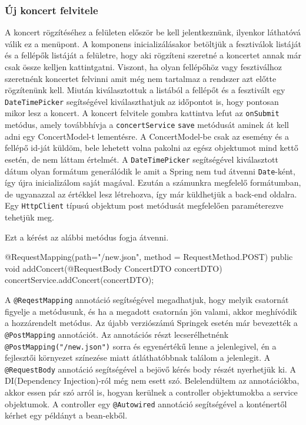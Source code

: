 \subsubsection{Új koncert felvitele}
A koncert rögzítéséhez a felületen először be kell jelentkeznünk, ilyenkor láthatóvá válik ez a menüpont. A komponens inicializálásakor betöltjük a fesztiválok listáját és a fellépők listáját a felületre, hogy aki rögzíteni szeretné a koncertet annak már csak össze kelljen kattintgatni. Viszont, ha olyan fellépőhöz vagy fesztiválhoz szeretnénk koncertet felvinni amit még nem tartalmaz a rendszer azt előtte rögzítenünk kell. Miután kiválasztottuk a listából a fellépőt és a fesztivált egy \texttt{DateTimePicker} segítségével kiválaszthatjuk az időpontot is, hogy pontosan mikor lesz a koncert. A koncert felvitele gombra kattintva lefut az \texttt{onSubmit} metódus, amely továbbhívja a \texttt{concertService} \texttt{save} metódusát aminek át kell adni egy ConcertModel-t lementésre. A ConcertModel-be csak az esemény és a fellépő id-ját küldöm, bele lehetett volna pakolni az egész objektumot mind kettő esetén, de nem láttam értelmét. A \texttt{DateTimePicker} segítségével kiválasztott dátum olyan formátum generálódik le amit a Spring nem tud átvenni \texttt{Date}-ként, így újra inicializálom saját magával. Ezután a számunkra megfelelő formátumban, de ugyanazzal az értékkel lesz létrehozva, így már küldhetjük a back-end oldalra. Egy  \texttt{HttpClient} típusú objektum post metódusát megfelelően paraméterezve tehetjük meg.
Ezt a kérést az alábbi metódus fogja átvenni.
\begin{java}
@RequestMapping(path="/new.json", method = RequestMethod.POST)
public void addConcert(@RequestBody ConcertDTO concertDTO){
	concertService.addConcert(concertDTO);
}
\end{java}
A  \texttt{@ReqestMapping} annotáció segítségével megadhatjuk, hogy melyik csatornát figyelje a metódusunk, és ha a megadott csatornán jön valami, akkor meghívódik a hozzárendelt metódus. Az újabb verziószámú Springek esetén már bevezették a  \texttt{@PostMapping} annotációt. Az annotációs részt lecserélhetnénk \texttt{@PostMapping("/new.json")} sorra és egyenértékű lenne a jelenlegivel, én a fejlesztői környezet színezése miatt átláthatóbbnak találom a jelenlegit. A \texttt{@RequestBody} annotáció segítségével a bejövő kérés body részét nyerhetjük ki. A DI(Dependency Injection)-ról még nem esett szó. Belelendültem az annotációkba, akkor essen pár szó arról is, hogyan kerülnek a controller objektumokba a service objektumok. A controller egy \texttt{@Autowired} annotáció segítségével a konténertől kérhet egy példányt a bean-ekből. 

